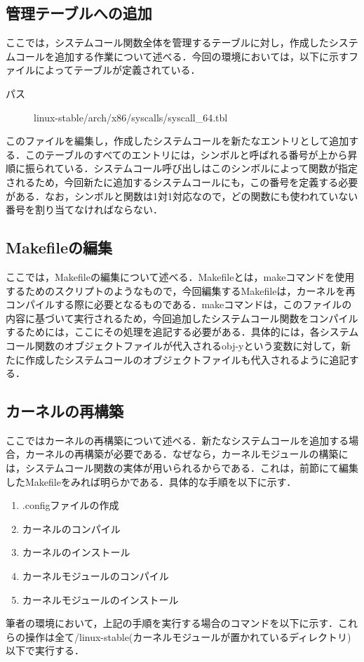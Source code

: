\documentclass[12pt]{jsarticle}
\begin{document}
\subsection{管理テーブルへの追加}
ここでは，システムコール関数全体を管理するテーブルに対し，作成したシステムコールを追加する作業について述べる．今回の環境においては，以下に示すファイルによってテーブルが定義されている．
\begin{description}
\item [パス] linux-stable\slash{}arch\slash{}x86\slash{}syscalls\slash{}syscall\_64.tbl
\end{description}
このファイルを編集し，作成したシステムコールを新たなエントリとして追加する．このテーブルのすべてのエントリには，シンボルと呼ばれる番号が上から昇順に振られている．システムコール呼び出しはこのシンボルによって関数が指定されるため，今回新たに追加するシステムコールにも，この番号を定義する必要がある．なお，シンボルと関数は1対1対応なので，どの関数にも使われていない番号を割り当てなければならない．
\subsection{Makefileの編集}
ここでは，Makefileの編集について述べる．Makefileとは，makeコマンドを使用するためのスクリプトのようなもので，今回編集するMakefileは，カーネルを再コンパイルする際に必要となるものである．makeコマンドは，このファイルの内容に基づいて実行されるため，今回追加したシステムコール関数をコンパイルするためには，ここにその処理を追記する必要がある．具体的には，各システムコール関数のオブジェクトファイルが代入されるobj-yという変数に対して，新たに作成したシステムコールのオブジェクトファイルも代入されるように追記する．
\subsection{カーネルの再構築}
ここではカーネルの再構築について述べる．新たなシステムコールを追加する場合，カーネルの再構築が必要である．なぜなら，カーネルモジュールの構築には，システムコール関数の実体が用いられるからである．これは，前節にて編集したMakefileをみれば明らかである．具体的な手順を以下に示す．
\begin{enumerate}
\item .configファイルの作成
\item カーネルのコンパイル
\item カーネルのインストール
\item カーネルモジュールのコンパイル
\item カーネルモジュールのインストール
\end{enumerate}
筆者の環境において，上記の手順を実行する場合のコマンドを以下に示す．これらの操作は全て\slash{}linux-stable(カーネルモジュールが置かれているディレクトリ)以下で実行する．
\end{document}
